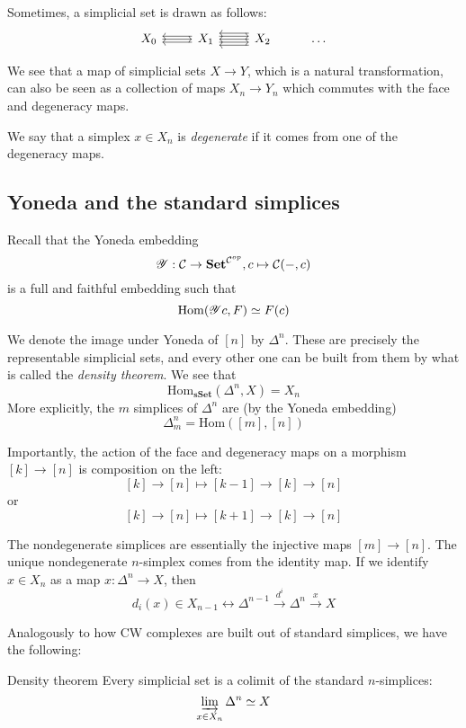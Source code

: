 Sometimes, a simplicial set is drawn as follows: \[\begin{tikzcd}
	{X_0} & {X_1} & {X_2} & \dots
	\arrow[from=1-1, to=1-2]
	\arrow[shift right, from=1-2, to=1-1]
	\arrow[shift left, from=1-2, to=1-1]
	\arrow[shift right, from=1-2, to=1-3]
	\arrow[shift left, from=1-2, to=1-3]
	\arrow[shift left=2, from=1-3, to=1-2]
	\arrow[from=1-3, to=1-2]
	\arrow[shift right=2, from=1-3, to=1-2]
\end{tikzcd}\]

We see that a map of simplicial sets $X\rightarrow Y$, which is a natural transformation, can also be seen as a collection of maps $X_n\rightarrow Y_n$ which commutes with the face and degeneracy maps.

We say that a simplex $x\in X_n$ is \emph{degenerate} if it comes from one of the degeneracy maps. 

\subsection{Yoneda and the standard simplices}

Recall that the Yoneda embedding $$\mathscr{Y}:\mathcal{C}\rightarrow \operatorname{\mathbf{Set}}^{\mathcal{C}^{op}}, c\mapsto \mathcal{C}(-,c)$$
is a full and faithful embedding such that $$\operatorname{Hom}(\mathscr{Y}c, F)\simeq F(c)$$

We denote the image under Yoneda of $[n]$ by $\Delta^n$. These are precisely the representable simplicial sets, and every other one can be built from them by what is called the \emph{density theorem}. We see that
$$\mathrm{Hom}_{\mathbf{sSet}}(\Delta^n, X)=X_n$$
More explicitly, the $m$ simplices of $\Delta^n$ are (by the Yoneda embedding) $$\Delta^n_m=\mathrm{Hom}([m],[n])$$

Importantly, the action of the face and degeneracy maps on a morphism $[k]\rightarrow [n]$ is composition on the left: $$[k]\rightarrow [n]\mapsto [k-1]\rightarrow [k]\rightarrow [n]$$or 
$$[k]\rightarrow [n]\mapsto [k+1]\rightarrow [k]\rightarrow [n]$$

The nondegenerate simplices are essentially the injective maps $[m]\rightarrow [n]$. The unique nondegenerate $n$-simplex comes from the identity map. If we identify $x\in X_n$ as a map $x:\Delta^n\rightarrow X$, then $$d_i(x)\in X_{n-1}\leftrightarrow \Delta^{n-1}\xrightarrow{d^i}\Delta^n \xrightarrow{x}X$$

Analogously to how CW complexes are built out of standard simplices, we have the following:
\begin{theorem}{Density theorem}{}
Every simplicial set is a colimit of the standard $n$-simplices: $$\varinjlim_{x\in X_n}\Delta^n \simeq X$$    
\end{theorem}

